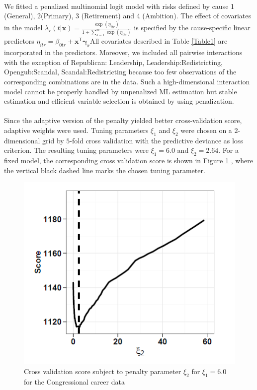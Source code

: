 \documentclass[]{article}
\begin{document}
        \paragraph{}We fitted a penalized multinomial logit model with risks defined by cause 1 (General), 2(Primary), 3 (Retirement) and 4 (Ambition). The effect of covariates in the model $\lambda_r(t|\mathbf{x}) = \frac{ \exp{ ( \eta_{itr} ) } }{ 1+ \sum_{s=1}^{m} \exp{ (\eta_{its}) }  }$ is specified by the cause-specific linear predictors $\eta_{itr} = \beta_{0tr}+\mathbf{x}^\mathsf{T} \mathbf{\gamma_r}$All covariates described in Table \ref{Table1} are incorporated in the predictors. Moreover, we included all pairwise interactions with the exception of  Republican: Leadership, Leadership:Redistricting, Opengub:Scandal, Scandal:Redistricting because too few observations of the corresponding combinations are in the data. Such a high-dimensional interaction model cannot be properly handled by unpenalized ML estimation but stable estimation and efficient variable selection is obtained by using penalization. 
        \paragraph{} Since the adaptive version of the penalty yielded better cross-validation score, adaptive weights were used. Tuning parameters $\xi_1$ and $\xi_2$ were chosen on a $2$-dimensional grid by $5$-fold cross validation with the predictive deviance as loss criterion. The resulting tuning
        parameters were $\xi_1 = 6.0$ and $\xi_2 = 2.64$. For a fixed model, the corresponding cross validation score is shown in Figure \ref{Figure1}
        , where the vertical black dashed line marks the chosen tuning parameter.
        \begin{figure}[H]
            \centering
            \includegraphics[scale=0.7]{./Figure1.png}
            \caption{Cross validation score subject to penalty parameter $\xi_2$ for $\xi_1 = 6.0$ for the Congressional career data}
            \label{Figure1}
        \end{figure}
\end{document}

